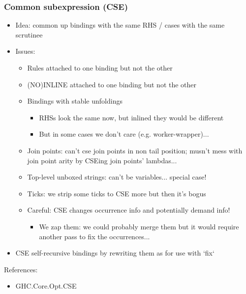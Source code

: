 \documentclass[aspectratio=169]{beamer}
\begin{document}
\begin{frame}
  \frametitle{Common subexpression (CSE)}

  \begin{itemize}
    \item Idea: common up bindings with the same RHS / cases with the same
      scrutinee
    \item Issues:
      \begin{itemize}
        \item Rules attached to one binding but not the other
        \item (NO)INLINE attached to one binding but not the other
        \item Bindings with stable unfoldings
          \begin{itemize}
            \item RHSs look the same now, but inlined they would be different
            \item But in some cases we don't care (e.g. worker-wrapper)...
          \end{itemize}
        \item Join points: can't cse join points in non tail position; musn't
          mess with join point arity by CSEing join points' lambdas...
        \item Top-level unboxed strings: can't be variables... special case!
        \item Ticks: we strip some ticks to CSE more but then it's bogus
        \item Careful: CSE changes occurrence info and potentially demand info!
          \begin{itemize}
            \item We zap them: we could probably merge them but it would require
              another pass to fix the occurrences...
          \end{itemize}
      \end{itemize}
    \item CSE self-recursive bindings by rewriting them as for use with `fix`
  \end{itemize}

  References:
  \begin{itemize}
    \item GHC.Core.Opt.CSE
  \end{itemize}
\end{frame}
\end{document}
